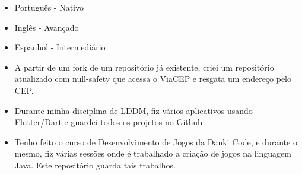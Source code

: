 \begin{itemize}
    \setlength\itemsep{1em}
    \item Português - Nativo 
    \item Inglês \hspace{16pt}- Avançado
    \item Espanhol \hspace{1pt} - Intermediário
\end{itemize}







\begin{itemize}
\item A partir de um fork de um repositório já existente, criei um repositório atualizado com null-safety que 
acessa o ViaCEP e resgata um endereço pelo CEP.
\end{itemize}
\smallskip
{}
\begin{itemize}
\item Durante minha disciplina de LDDM, fiz vários aplicativos usando Flutter/Dart e guardei todos os projetos no Github
\end{itemize}
\smallskip
{}
\begin{itemize}
\item Tenho feito o curso de Desenvolvimento de Jogos da Danki Code, e durante o mesmo, fiz várias sessões onde é trabalhado a criação de jogos na linguagem Java. Este repositório guarda tais trabalhos. 
\end{itemize}
\smallskip

